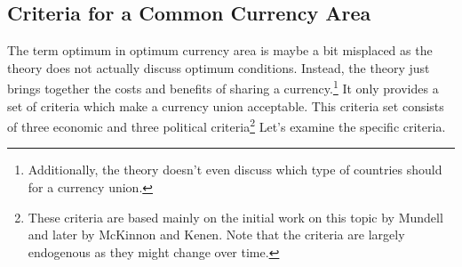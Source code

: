 \documentclass{tufte-handout}
\begin{document}
\subsection{Criteria for a Common Currency Area}
The term optimum in optimum currency area is maybe a bit misplaced as the theory does not actually discuss optimum conditions. 
Instead, the theory just brings together the costs and benefits of sharing a currency.\footnote{Additionally, the theory doesn't even discuss which type of countries should for a currency union.} 
It only provides a set of criteria which make a currency union acceptable. 
This criteria set consists of three economic and three political criteria\footnote{These criteria are based mainly on the initial work on this topic by Mundell and later by McKinnon and Kenen. Note that the criteria are largely endogenous as they might change over time.} 
Let's examine the specific criteria. 
\end{document}
